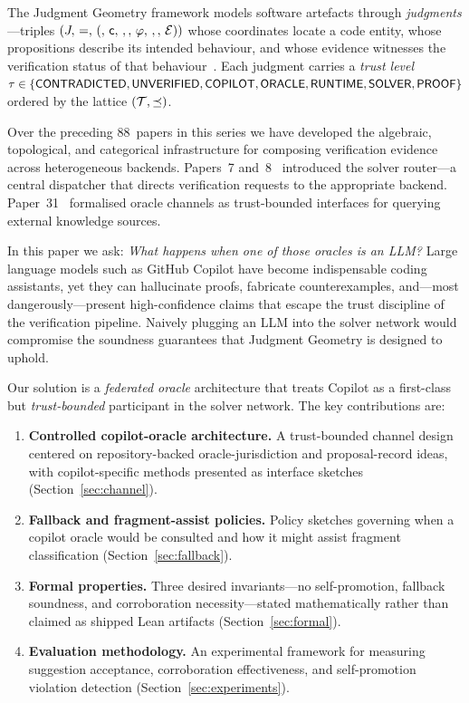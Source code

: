\documentclass[11pt]{article}
\begin{document}
The Judgment Geometry framework models software artefacts through
\emph{judgments}---triples $(J,\,=,\,(,\,\mathsf{c},\,,,\,\varphi,\,,,\,\mathcal{E}))$ whose
coordinates locate a code entity, whose propositions describe its
intended behaviour, and whose evidence witnesses the verification
status of that behaviour~\cite{young2024jg1,young2024jg4}.  Each
judgment carries a \emph{trust level}
$\tau \in \{\mathsf{CONTRADICTED}, \mathsf{UNVERIFIED}, \mathsf{COPILOT}, \mathsf{ORACLE}, \mathsf{RUNTIME},
\mathsf{SOLVER}, \mathsf{PROOF}\}$
ordered by the lattice $(\mathcal{T}, \preceq)$.

Over the preceding 88~papers in this series we have developed the
algebraic, topological, and categorical infrastructure for composing
verification evidence across heterogeneous backends.  Papers~7
and~8~\cite{young2024jg7,young2024jg8} introduced the solver
router---a central dispatcher that directs verification requests to
the appropriate backend.  Paper~31~\cite{young2024jg31} formalised
oracle channels as trust-bounded interfaces for querying external
knowledge sources.

In this paper we ask: \emph{What happens when one of those oracles
is an LLM?}  Large language models such as GitHub Copilot have become
indispensable coding assistants, yet they can hallucinate proofs,
fabricate counterexamples, and---most dangerously---present
high-confidence claims that escape the trust discipline of the
verification pipeline.  Naively plugging an LLM into the solver
network would compromise the soundness guarantees that Judgment
Geometry is designed to uphold.

Our solution is a \emph{federated oracle} architecture that treats
Copilot as a first-class but \emph{trust-bounded} participant in the
solver network.  The key contributions are:

\begin{enumerate}
  \item \textbf{Controlled copilot-oracle architecture.}  A trust-bounded
    channel design centered on repository-backed oracle-jurisdiction and
    proposal-record ideas, with copilot-specific methods presented as
    interface sketches (Section~\ref{sec:channel}).

  \item \textbf{Fallback and fragment-assist policies.}
    Policy sketches governing when a copilot oracle would be consulted
    and how it might assist fragment classification
    (Section~\ref{sec:fallback}).

  \item \textbf{Formal properties.}  Three desired invariants---no
    self-promotion, fallback soundness, and corroboration
    necessity---stated mathematically rather than claimed as shipped
    Lean artifacts (Section~\ref{sec:formal}).

  \item \textbf{Evaluation methodology.}  An experimental
    framework for measuring suggestion acceptance, corroboration
    effectiveness, and self-promotion violation detection
    (Section~\ref{sec:experiments}).
\end{enumerate}
\end{document}
